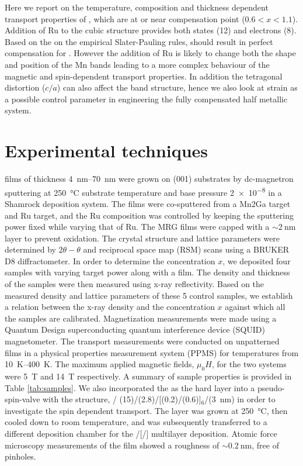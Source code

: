 \documentclass[reprint,aip,apl,floatfix,linenumbers,superscriptaddress]{revtex4-1}
\begin{document}
Here we report on the temperature, composition and thickness dependent transport properties of , which are at or near compensation point ($0.6<x<1.1$). Addition of Ru to the cubic  structure provides both states (\num{12}) and electrons (\num{8}). Based on the on the empirical Slater-Pauling rules, should result in perfect compensation for . However the addition of Ru is likely to change both the shape and position of the Mn bands leading to a more complex behaviour of the magnetic and spin-dependent transport properties. In addition the tetragonal distortion ($c/a$) can also affect the band structure, hence we also look at strain as a possible control parameter in engineering the  fully compensated half metallic system.


\section{Experimental techniques}
\label{sec:exp_tech}

 films of thickness \SIrange{4}{70}{\nano\metre} were grown on  (001) substrates by dc-magnetron sputtering at \SI{250}{\celsius} substrate temperature and base pressure \SI{2e-8}{\torr} in a Shamrock deposition system. The films were co-sputtered from a Mn2Ga target and Ru target, and the Ru composition was controlled by keeping the  sputtering power fixed while varying that of Ru. The MRG films were capped with a  $\sim \SI{2}{\nano\metre}$  layer to prevent oxidation.  The crystal structure and lattice parameters were determined by $2\theta-\theta$ and reciprocal space map (RSM) scans using a BRUKER D8 diffractometer. In order to determine the  concentration $x$, we deposited four samples with varying  target power along with a  film. The density and thickness of the samples were then measured using x-ray reflectivity. Based on the measured density and lattice parameters of these 5 control samples, we establish a relation between the x-ray density and the  concentration $x$ against which all the samples are calibrated. Magnetization measurements were made using a Quantum Design superconducting quantum interference device (SQUID) magnetometer. The transport measurements were conducted on unpatterned  films in a physical properties measurement system (PPMS) for temperatures from \SIrange{10}{400}{\kelvin}. The maximum applied magnetic fields, $\mu_0H$, for the two systems were \SI{5}{\tesla} and \SI{14}{\tesla} respectively. A summary of sample properties is provided in Table \ref{tab:samples}. We also incorporated the  as the hard layer into a pseudo-spin-valve with the structure, / (15)/(2.8)/[(0.2)/(0.6)]$_6$/(\SI{3}{\nano\metre}) in order to investigate the spin dependent transport. The  layer was grown at \SI{250}{\celsius}, then cooled down to room temperature, and was subsequently transferred to a different deposition chamber for the /[/] multilayer deposition. Atomic force microscopy measurements of the  film showed a roughness of $\sim \SI{0.2}{\nano\metre}$, free of pinholes. 
\end{document}
